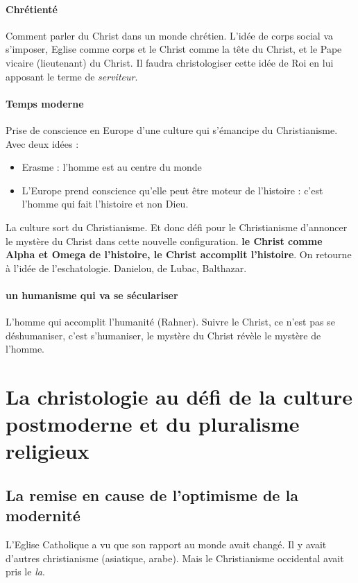 \paragraph{Chrétienté} Comment parler du Christ dans un monde chrétien. L'idée de corps social va s'imposer, Eglise comme corps et le Christ comme la tête du Christ, et le Pape vicaire (lieutenant) du Christ. Il faudra christologiser cette idée de Roi en lui apposant le terme de \textit{serviteur}. 

\paragraph{Temps moderne} Prise de conscience en Europe d'une culture qui s'émancipe du Christianisme. Avec deux idées : 
\begin{itemize}
    \item Erasme : l'homme est au centre du monde
    \item L'Europe prend conscience qu'elle peut être moteur de l'histoire : c'est l'homme qui fait l'histoire et non Dieu.
\end{itemize}
La culture sort du Christianisme. Et donc défi pour le Christianisme d'annoncer le mystère du Christ dans cette nouvelle configuration. \textbf{le Christ comme Alpha et Omega de l'histoire, le Christ accomplit l'histoire}. On retourne à l'idée de l'eschatologie. Danielou, de Lubac, Balthazar.

\paragraph{un humanisme qui va se séculariser} L'homme qui accomplit l'humanité (Rahner). Suivre le Christ, ce n'est pas se déshumaniser, c'est s'humaniser, le mystère du Christ révèle le mystère de l'homme.


\section{La christologie au défi de la culture postmoderne et du pluralisme religieux}

 
\subsection{La remise en cause de l’optimisme de la modernité}

L'Eglise Catholique a vu que son rapport au monde avait changé. Il y avait d'autres christianisme (asiatique, arabe). Mais le Christianisme occidental avait pris le \textit{la}. 

